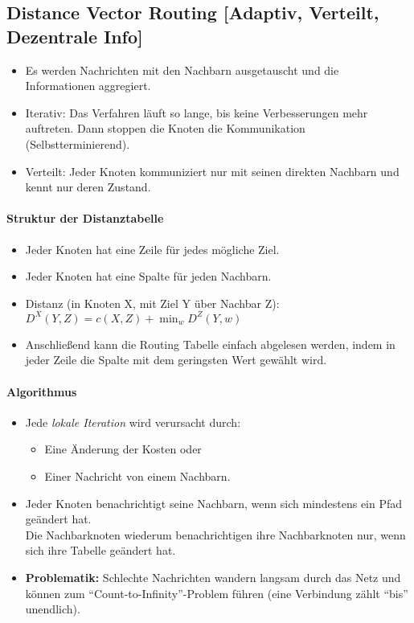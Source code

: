 		\subsection{Distance Vector Routing [Adaptiv, Verteilt, Dezentrale Info]}
			\begin{itemize}
				\item Es werden Nachrichten mit den Nachbarn ausgetauscht und die Informationen aggregiert.
				\item Iterativ: Das Verfahren läuft so lange, bis keine Verbesserungen mehr auftreten. Dann stoppen die Knoten die Kommunikation (Selbstterminierend).
				\item Verteilt: Jeder Knoten kommuniziert nur mit seinen direkten Nachbarn und kennt nur deren Zustand.
			\end{itemize}

			\paragraph{Struktur der Distanztabelle}
				\begin{itemize}
					\item Jeder Knoten hat eine Zeile für jedes mögliche Ziel.
					\item Jeder Knoten hat eine Spalte für jeden Nachbarn.
					\item Distanz (in Knoten X, mit Ziel Y über Nachbar Z): \( D ^ X (Y, Z) = c(X, Z) + \min _ w { D ^ Z (Y, w) } \)
					\item Anschließend kann die Routing Tabelle einfach abgelesen werden, indem in jeder Zeile die Spalte mit dem geringsten Wert gewählt wird.
				\end{itemize}

			\paragraph{Algorithmus}
				\begin{itemize}
					\item Jede \textit{lokale Iteration} wird verursacht durch:
						\begin{itemize}
							\item Eine Änderung der Kosten oder
							\item Einer Nachricht von einem Nachbarn.
						\end{itemize}
					\item Jeder Knoten benachrichtigt seine Nachbarn, wenn sich mindestens ein Pfad geändert hat. \\ Die Nachbarknoten wiederum benachrichtigen ihre Nachbarknoten nur, wenn sich ihre Tabelle geändert hat.
					\item \textbf{Problematik:} Schlechte Nachrichten wandern langsam durch das Netz und können zum \enquote{Count-to-Infinity}-Problem führen (eine Verbindung zählt \enquote{bis} unendlich).
				\end{itemize}

